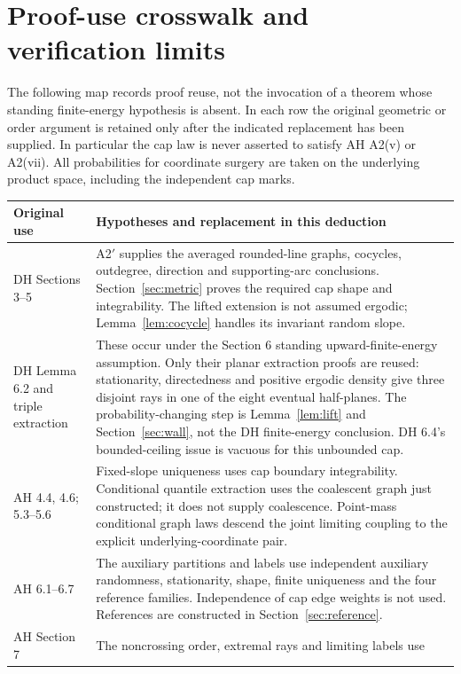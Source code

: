 \section{Proof-use crosswalk and verification limits}\label{sec:coverage}\label{sec:uses}
The following map records proof reuse, not the invocation of a theorem whose
standing finite-energy hypothesis is absent. In each row the original geometric
or order argument is retained only after the indicated replacement has been
supplied. In particular the cap law is never asserted to satisfy AH A2(v) or
A2(vii). All probabilities for coordinate surgery are taken on the underlying
product space, including the independent cap marks.

\begin{longtable}{@{}>{\raggedright\arraybackslash}p{}>{\raggedright\arraybackslash}p{}@{}}
\toprule
Original use & Hypotheses and replacement in this deduction \\\midrule\endhead
DH Sections 3--5 & A2$'$ supplies the averaged rounded-line graphs, cocycles,
outdegree, direction and supporting-arc conclusions. Section~\ref{sec:metric}
proves the required cap shape and integrability. The lifted extension is not
assumed ergodic; Lemma~\ref{lem:cocycle} handles its invariant random slope.\\
DH Lemma 6.2 and triple extraction & These occur under the Section 6 standing
upward-finite-energy assumption. Only their planar extraction proofs are reused:
stationarity, directedness and positive ergodic density give three disjoint
rays in one of the eight eventual half-planes. The probability-changing step
is Lemma~\ref{lem:lift} and Section~\ref{sec:wall}, not the DH finite-energy
conclusion. DH 6.4's bounded-ceiling issue is vacuous for this unbounded cap.\\
AH 4.4, 4.6; 5.3--5.6 & Fixed-slope uniqueness uses cap boundary integrability.
Conditional quantile extraction uses the coalescent graph just constructed;
it does not supply coalescence. Point-mass conditional graph laws descend the
joint limiting coupling to the explicit underlying-coordinate pair.\\
AH 6.1--6.7 & The auxiliary partitions and labels use independent auxiliary
randomness, stationarity, shape, finite uniqueness and the four reference
families. Independence of cap edge weights is not used. References are
constructed in Section~\ref{sec:reference}.\\
AH Section 7 & The noncrossing order, extremal rays and limiting labels use

\end{longtable}
